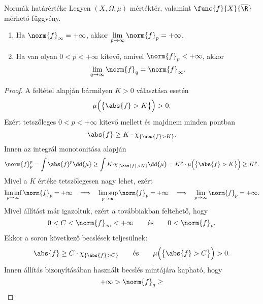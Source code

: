 \documentclass[
]{elteikthesis}[2024/04/26]
\begin{document}
	\newpage
	\begin{theorem}{Normák határértéke}{}
		Legyen \( (X, \Omega, \mu) \) mértéktér, 
		valamint \( \func{f}{X}{\overline{\R}} \) mérhető függvény.
		\begin{enumerate}
			\item\label{eq:lp-norma-határérték-01}
			Ha \( \norm{f}_\infty = +\infty \),
			akkor \( \lim\limits_{p \to \infty} \norm{f}_p = +\infty \).
			
			\item\label{eq:lp-norma-határérték-02}
			Ha van olyan \( 0 < p < +\infty \) kitevő, amivel \( \norm{f}_p < +\infty \), akkor
			\[
				\lim\limits_{q \to \infty} \norm{f}_q = \norm{f}_\infty.
			\]
		\end{enumerate}
	\end{theorem}
	\begin{proof}
		A feltétel alapján bármilyen \( K > 0 \) választása esetén
		\[
			\mu \Bigl( \bigl\{ \abs{f} > K \bigr\} \Bigr) > 0.
		\]
		Ezért tetszőleges \( 0 < p < +\infty \) kitevő mellett és majdnem minden pontban
		\[
			\abs{f} \geq 
			K \cdot \chi_{\{ \abs{f} > K \}}.
		\]
		Innen az integrál monotonitása alapján
		\[
			\norm{f}_p^p = 
			\int \abs{f}^p \dd{\mu} \geq
			\int K {\cdot} \chi_{\{ \abs{f} > K \}} \dd{\mu} =
			K^p \cdot \mu \Bigl( \bigl\{ \abs{f} > K \bigr\} \Bigr) \geq 
			K^p.
		\]
		Mivel a \( K \) értéke tetszőlegesen nagy lehet, ezért
		\[
			\liminf_{p \to \infty} \norm{f}_p = +\infty
			\quad \Longrightarrow \quad
			\limsup_{p \to \infty} \norm{f}_p = +\infty
			\quad \Longrightarrow \quad
			\lim_{p \to \infty} \norm{f}_p = +\infty.
		\]
		Mivel  állítást már igazoltuk,
		ezért a továbbiakban feltehető, hogy
		\[
			0 < C < \norm{f}_\infty < +\infty
			\qquad \text{és} \qquad
			0 < \norm{f}_p.
		\]
		Ekkor a soron következő becslések teljesülnek:
		\[
			\abs{f} \geq C \cdot \chi_{\{ \abs{f} > C \}}
			\qquad \text{és} \qquad
			\mu \Bigl( \bigl\{ \abs{f} > C \bigr\} \Bigr) > 0.
		\]
		Innen  állítás bizonyításában használt 
		becslés mintájára kapható, hogy
		\[
			+\infty > 
			\norm{f}_q \geq 
\]
\end{proof}
\end{document}
